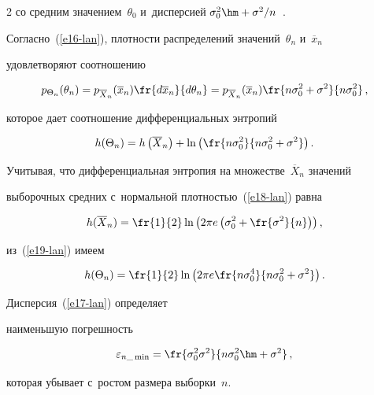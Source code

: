 \begin{multicols}{2}
со сред\-ним значением~$\theta_0$ и~дисперсией $\sigma_0^2\hm+ \sigma^2/n$~\cite{13-lan}.





Согласно~(\ref{e16-lan}), плотности распределений значений~$\theta_n$ и~$\overline{x}_n$ 


удовле\-тво\-ря\-ют соотношению 


$$


p_{\Theta_n}(\theta_n) =p_{\overline{X}_n} (\overline{x}_n)\fr{d\overline{x}_n}{d\theta_n} = 


p_{\overline{X}_n}(\overline{x}_n) \fr{n\sigma_0^2+\sigma^2}{n\sigma_0^2}\,,


$$


которое дает соотношение дифференциальных энтропий


\begin{equation}


h(\Theta_n) =h\left( \overline{X}_n\right) +\ln \left( 


\fr{n\sigma_0^2}{n\sigma_0^2+\sigma^2}\right).


\label{e19-lan}


\end{equation}


Учитывая, что дифференциальная энтропия на множестве~$\overline{X}_n$ значений 


выборочных сред\-них с~нормальной плот\-ностью~(\ref{e18-lan}) равна 


$$


h(\overline{X}_n)=\fr{1}{2} \ln \left(2\pi e \left(\sigma_0^2+ \fr{\sigma^2}{n}\right)\right),


$$


 из~(\ref{e19-lan}) имеем 


 $$


 h(\Theta_n) = \fr{1}{2} 


\ln \left(2\pi e  \fr{n\sigma_0^4}{n\sigma_0^2+ \sigma^2}\right).


$$


 Дисперсия~(\ref{e17-lan}) определяет 


наименьшую по\-греш\-ность


$$


\varepsilon_{n\_\min} = \fr{\sigma_0^2 \sigma^2}{n\sigma_0^2\hm+ 


\sigma^2}\,,


$$


 которая убывает с~рос\-том размера выборки~$n$.






\end{multicols}
